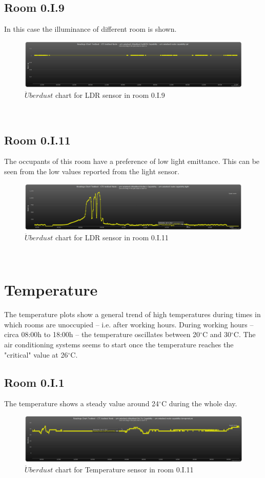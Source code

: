 \documentclass[12pt,a4paper,draft]{report}
\begin{document}
\subsection{Room 0.I.9}
%
In this case the illuminance of different room is shown.
\begin{figure}[H]
\centering
	\includegraphics*[scale=0.3]{pir_9}
	\caption{$\ddot{U}berdust$ chart for LDR sensor in room 0.I.9}
	\label{chart_light_9}
\end{figure}
\ \\
%
\subsection{Room 0.I.11}
%
The occupants of this room have a preference of low light emittance.
This can be seen from the low values reported from the light sensor.
\begin{figure}[H]
\centering
	\includegraphics*[scale=0.3]{light_11}
	\caption{$\ddot{U}berdust$ chart for LDR sensor in room 0.I.11}
	\label{chart_light_11}
\end{figure}
\ \\
%
\section{Temperature}
%
The temperature plots show a general trend of high temperatures during times in which rooms are unoccupied -- i.e. after working hours.
During working hours -- circa 08:00h to 18:00h -- the temperature oscillates between 20$^\circ$C and 30$^\circ$C.
The air conditioning systems seems to start once the temperature reaches the "critical" value at 26$^\circ$C.
\subsection{Room 0.I.1}
%
The temperature shows a steady value around 24$^\circ$C during the whole day.
\begin{figure}[H]
\centering
	\includegraphics*[scale=0.3]{temp_1}
	\caption{$\ddot{U}berdust$ chart for Temperature sensor in room 0.I.11}
	\label{chart_temp_1}
\end{figure}
\ \\
%
\end{document}
